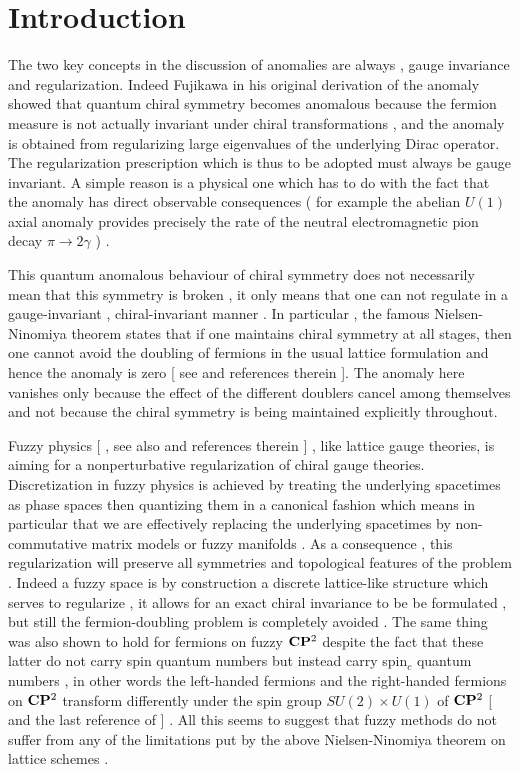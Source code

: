 \documentclass[a4paper,10pt]{article}
\begin{document}
\setcounter{page}{1}

\section{Introduction}

The two key concepts in the discussion of anomalies are always ,
gauge invariance and regularization. Indeed Fujikawa
\cite{fujikawa} in his original derivation of the anomaly showed
that quantum chiral symmetry becomes anomalous because the
fermion measure is not actually invariant under chiral
transformations , and the anomaly is obtained from regularizing
large eigenvalues of the underlying Dirac operator. The
regularization prescription which is thus to be adopted must
always be gauge invariant. A simple reason is a physical one
which has to do with the fact that the anomaly has direct
observable consequences ( for example the abelian $U(1)$ axial
anomaly provides precisely the rate of the neutral
electromagnetic pion decay ${\pi}{\longrightarrow}2{\gamma}$ ) .



This quantum anomalous behaviour of chiral symmetry does not
necessarily mean that this symmetry is broken , it only means that
one can not regulate in a gauge-invariant , chiral-invariant
manner . In particular , the famous Nielsen-Ninomiya theorem
\cite{nielsen-ninomiya} states that if one maintains chiral
symmetry at all stages, then one cannot avoid the doubling of
fermions in the usual lattice formulation and hence the anomaly
is zero [ see \cite{creutz} and references therein ]. The anomaly
here vanishes only because the effect of the different doublers
cancel among themselves and not because the chiral symmetry is
being maintained explicitly throughout.




Fuzzy physics [\cite{madore,GKP} , see also \cite{ydri} and
references therein ] , like lattice gauge theories, is aiming for
a nonperturbative regularization of chiral gauge theories.
Discretization in fuzzy physics is achieved by treating the
underlying  spacetimes as phase spaces then quantizing them in a
canonical fashion which means in particular that we are
effectively replacing the underlying spacetimes by non-commutative
matrix models or fuzzy manifolds \cite{ydri,cmlv} . As a
consequence , this regularization will preserve all symmetries
and topological features of the problem . Indeed a fuzzy space is
by construction a discrete lattice-like structure which serves to
regularize , it allows for an exact chiral invariance to be be
formulated  , but still the fermion-doubling problem is
completely avoided \cite{trg} . The same thing was also shown to
hold for fermions on fuzzy ${\bf C}{\bf P}^2$ despite the fact
that these latter do not carry spin quantum numbers but instead
carry spin$_c$ quantum numbers , in other words the left-handed
fermions and the right-handed fermions on ${\bf C}{\bf P}^2$
transform differently under the spin group $SU(2){\times}U(1)$ of
${\bf C}{\bf P}^2$ [ \cite{giorgio} and the last reference of
\cite{GKP} ] . All this seems to suggest that  fuzzy methods do
not suffer from any of the limitations put by the above
Nielsen-Ninomiya theorem on lattice schemes .
\end{document}
